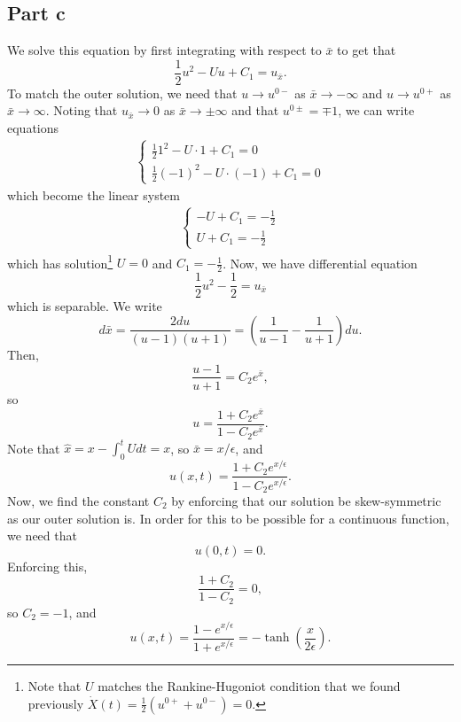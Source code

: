 \documentclass{article}
\begin{document}
\subsection{Part c}
We solve this equation by first integrating with respect to $\bar{x}$ to get that 
\[
\frac{1}{2}u^2-Uu+C_1=u_{\bar{x}}.
\]
To match the outer solution, we need that $u\to u^{0-}$ as $\bar{x}\to-\infty$ and $u\to u^{0+}$ as $\bar{x}\to\infty$. Noting that $u_{\bar{x}}\to0$ as $\bar{x}\to\pm\infty$ and that $u^{0\pm}=\mp1$, we can write equations
\begin{align*}
\begin{cases}
\frac{1}{2}1^2-U\cdot1+C_1=0\\
\frac{1}{2}(-1)^2-U\cdot(-1)+C_1=0
\end{cases}
\end{align*}
which become the linear system
\begin{align*}
	\begin{cases}
		-U+C_1=-\frac{1}{2}\\
		U+C_1=-\frac{1}{2}
	\end{cases}
\end{align*}
which has solution\footnote{Note that $U$ matches the Rankine-Hugoniot condition that we found previously $\dot{X}(t)=\frac{1}{2}(u^{0+}+u^{0-})=0$.} $U=0$ and $C_1=-\frac{1}{2}$. Now, we have differential equation
\[
\frac{1}{2}u^2-\frac{1}{2}=u_{\bar{x}}
\]
which is separable. We write
\[
d\bar{x}=\frac{2du}{(u-1)(u+1)}=\left(\frac{1}{u-1}-\frac{1}{u+1}\right)du.
\]
Then,
\[
\frac{u-1}{u+1}=C_2e^{\bar{x}},
\]
so 
\[
u=\frac{1+C_2e^{\bar{x}}}{1-C_2e^{\bar{x}}}.
\]
Note that $\hat{x}=x-\int_0^t Udt=x$, so $\bar{x}=x/\epsilon$, and
\[
u(x,t)=\frac{1+C_2e^{x/\epsilon}}{1-C_2e^{x/\epsilon}}.
\]
Now, we find the constant $C_2$ by enforcing that our solution be skew-symmetric as our outer solution is. In order for this to be possible for a continuous function, we need that
\[
u(0,t)=0.
\]
Enforcing this, 
$$\frac{1+C_2}{1-C_2}=0,$$
so $C_2=-1$, and 
\[
u(x,t)=\frac{1-e^{x/\epsilon}}{1+e^{x/\epsilon}}=-\tanh\left(\frac{x}{2\epsilon}\right).
\]
\end{document}
